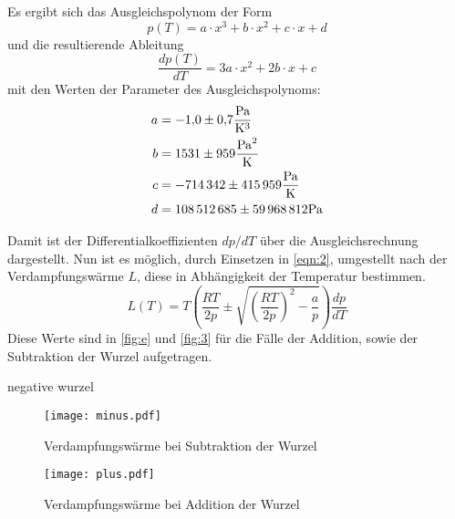 \noindent Es ergibt sich das Ausgleichspolynom der Form 
\begin{equation*}
  p(T) = a \cdot x^3 + b \cdot x^2 + c \cdot x + d 
\end{equation*}
\noindent und die resultierende Ableitung
\begin{equation*}
  \frac{dp(T)}{dT} = 3a \cdot x^2 + 2b \cdot x + c 
\end{equation*}
mit den Werten der Parameter des Ausgleichspolynoms:
\begin{align*}
  a &= \num{-1.0 +- 0.7}\unit{\pascal\per\cubic\kelvin}\\
  b &= \num{1531 +- 959}\unit{\pascal\per\squared\kelvin}\\
  c &= \num{-714342 +- 415959}\unit{\pascal\per\kelvin}\\
  d &= \num{108512685 +- 59968812}\unit{\pascal}\\
\end{align*}

\noindent Damit ist der Differentialkoeffizienten $dp/dT$ über die
Ausgleichsrechnung dargestellt. Nun ist es möglich, durch Einsetzen in
\autoref{eqn:2}, umgestellt nach der Verdampfungswärme $L$,
diese in Abhängigkeit der Temperatur bestimmen.
\begin{equation}
L(T) = T \left(\frac{RT}{2p}\pm\sqrt{\left(\frac{RT}{2p}\right)^2-\frac{a}{p}}\right) \frac{dp}{dT}
\end{equation}
\noindent Diese Werte sind in \autoref{fig:e} und \autoref{fig:3} 
für die Fälle der Addition, sowie der Subtraktion der 
Wurzel aufgetragen.







negative wurzel
\begin{figure}[H]
  \centering
  \texttt{[image: minus.pdf]}
  \caption{Verdampfungswärme bei Subtraktion der Wurzel}
  \label{fig:e}
\end{figure}

\begin{figure}[H]
  \centering
  \texttt{[image: plus.pdf]}
  \caption{Verdampfungswärme bei Addition der Wurzel}
  \label{fig:3}
\end{figure}



